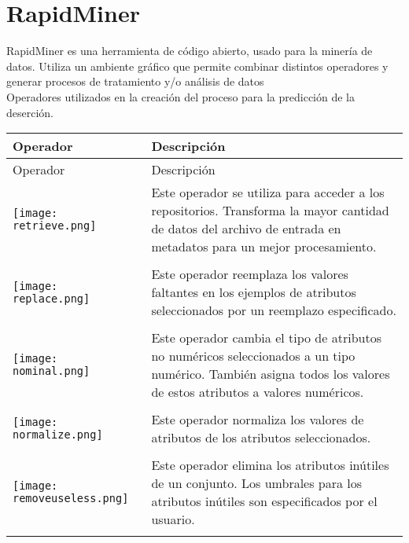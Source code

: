 \chapter{RapidMiner}
\label{ch:anexo-b}
\newpage

RapidMiner es una herramienta de código abierto, usado para la minería de datos. Utiliza un ambiente gráfico que permite combinar distintos operadores y generar procesos de tratamiento y/o análisis de datos\\

Operadores utilizados en la creación del proceso para la predicción de la deserción.\\

\begin{longtable}{>{\centering\arraybackslash}m{3cm} >{\centering\arraybackslash}m{8cm}}
		\hline
		Operador & Descripción \\
		\hline \hline
		\endfirsthead
		
		\hline
		Operador & Descripción \\
		\hline \hline
		\endhead
		
		 \texttt{[image: retrieve.png]} & Este operador se utiliza para acceder a los repositorios. Transforma la mayor cantidad de datos del archivo de entrada en metadatos para un mejor procesamiento. \\	\hline \\
		 
	     \texttt{[image: replace.png]} & Este operador reemplaza los valores faltantes en los ejemplos de atributos seleccionados por un reemplazo especificado. \\ \hline \\
		
	     \texttt{[image: nominal.png]} & Este operador cambia el tipo de atributos no numéricos seleccionados a un tipo numérico. También asigna todos los valores de estos atributos a valores numéricos. \\	\hline \\
		
	     \texttt{[image: normalize.png]} &  Este operador normaliza los valores de atributos de los atributos seleccionados.\\	\hline \\
	     
	     \texttt{[image: removeuseless.png]} & Este operador elimina los atributos inútiles de un conjunto. Los umbrales para los atributos inútiles son especificados por el usuario. \\	\hline \\
	     

\end{longtable}
